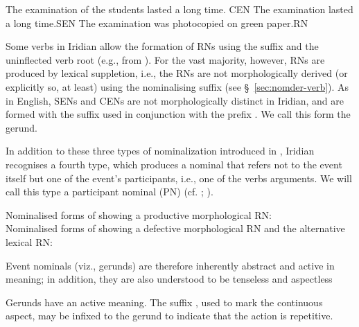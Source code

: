 \pex[interpartskip=0pt]
	\a The examination of the students lasted a long time. \hfill {CEN}
	\a The examination lasted a long time.\hfill {SEN}
	\a The examination was photocopied on green paper.\hfill {RN}\\
\xe

Some verbs in Iridian allow the formation of RNs using the suffix  and the uninflected verb root (e.g.,  from ). For the vast majority, however, RNs are produced by lexical suppletion, i.e., the RNs are not morphologically derived (or explicitly so, at least) using the nominalising suffix (see \S~\ref{sec:nomder-verb}). As in English, SENs and CENs are not morphologically distinct in Iridian, and are formed with the suffix  used in conjunction with the prefix . We call this form the {\sc gerund}.

In addition to these three types of nominalization introduced in \textcite{grimshaw1990}, Iridian recognises a fourth type, which produces a nominal that refers not to the event itself but one of the event's participants, i.e., one of the verbs arguments. We will call this type a {\sc participant nominal} (PN) (cf. \cite[400-5]{schackow2015}; \cite[297-8]{okuna}).

\pex \a Nominalised forms of  showing a productive morphological RN:\smallskip\\
\a Nominalised forms of  showing a defective morphological RN and the alternative lexical RN:\smallskip\\
	\xe


Event nominals (viz., gerunds) are therefore inherently abstract and active in meaning; in addition, they are also understood to be tenseless and aspectless

Gerunds have an active meaning. The suffix , used to mark the continuous aspect, may be infixed to the gerund to indicate that the action is repetitive.

